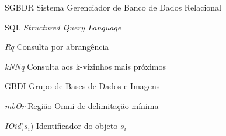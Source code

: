 
\begin{siglas}
    \item[SGBDR] Sistema Gerenciador de Banco de Dados Relacional
    \item[SQL] \textit{Structured Query Language}
    \item[\textit{Rq}] Consulta por abrangência
    \item[\textit{kNNq}] Consulta aos k-vizinhos mais próximos
    \item [GBDI] Grupo de Bases de Dados e Imagens
    \item [\textit{mbOr}] Região Omni de delimitação mínima
    \item [\textit{IOid}($s_i$)] Identificador do objeto $s_i$
\end{siglas}

